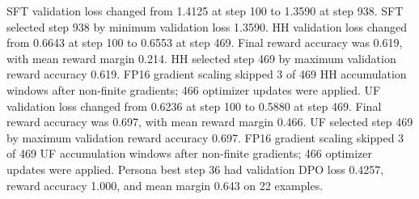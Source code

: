 SFT validation loss changed from 1.4125 at step 100 to 1.3590 at step 938. SFT selected step 938 by minimum validation loss 1.3590. HH validation loss changed from 0.6643 at step 100 to 0.6553 at step 469. Final reward accuracy was 0.619, with mean reward margin 0.214. HH selected step 469 by maximum validation reward accuracy 0.619. FP16 gradient scaling skipped 3 of 469 HH accumulation windows after non-finite gradients; 466 optimizer updates were applied. UF validation loss changed from 0.6236 at step 100 to 0.5880 at step 469. Final reward accuracy was 0.697, with mean reward margin 0.466. UF selected step 469 by maximum validation reward accuracy 0.697. FP16 gradient scaling skipped 3 of 469 UF accumulation windows after non-finite gradients; 466 optimizer updates were applied. Persona best step 36 had validation DPO loss 0.4257, reward accuracy 1.000, and mean margin 0.643 on 22 examples.
